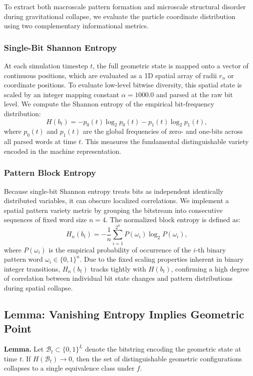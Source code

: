 \documentclass[11pt]{article}
\begin{document}
To extract both macroscale pattern formation and microscale structural disorder 
during gravitational collapse, we evaluate the particle coordinate distribution 
using two complementary informational metrics.

\subsubsection{Single-Bit Shannon Entropy}
At each simulation timestep $t$, the full geometric state is mapped onto a 
vector of continuous positions, which are evaluated as a 1D spatial array of 
radii $r_n$ or coordinate positions. To evaluate low-level bitwise diversity, 
this spatial state is scaled by an integer mapping constant $\alpha = 1000.0$ and 
parsed at the raw bit level. We compute the Shannon entropy of the empirical 
bit-frequency distribution:
\[
H(b_t) = -p_0(t)\log_2 p_0(t) - p_1(t)\log_2 p_1(t),
\]
where $p_0(t)$ and $p_1(t)$ are the global frequencies of zero- and
one-bits across all parsed words at time $t$. This measures the fundamental
distinguishable variety encoded in the machine representation.

\subsubsection{Pattern Block Entropy}
Because single-bit Shannon entropy treats bits as independent identically 
distributed variables, it can obscure localized correlations. We implement a spatial 
pattern variety metric by grouping the bitstream into consecutive sequences of fixed 
word size $n = 4$. The normalized block entropy is defined as:
\[
H_n(b_t) = -\frac{1}{n} \sum_{i=1}^{2^n} P(\omega_i) \log_2 P(\omega_i),
\]
where $P(\omega_i)$ is the empirical probability of occurrence of the $i$-th 
binary pattern word $\omega_i \in \{0,1\}^n$. Due to the fixed scaling properties 
inherent in binary integer transitions, $H_n(b_t)$ tracks tightly with $H(b_t)$, 
confirming a high degree of correlation between individual bit state changes 
and pattern distributions during spatial collapse.


\subsection{Lemma: Vanishing Entropy Implies Geometric Point}

\textbf{Lemma.} Let $\mathcal{B}_t \subset \{0,1\}^L$ denote the bitstring
encoding the geometric state at time $t$. If $H(\mathcal{B}_t) \to 0$, then
the set of distinguishable geometric configurations collapses to a single
equivalence class under $f$.
\end{document}
